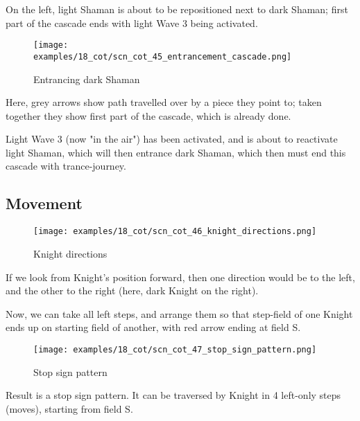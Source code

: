 On the left, light Shaman is about to be repositioned next to dark Shaman; first
part of the cascade ends with light Wave 3 being activated.

\vspace*{5.3\baselineskip}

\noindent
\begin{wrapfigure}[11]{l}{0.4\textwidth}
\centering
\texttt{[image: examples/18\_cot/scn\_cot\_45\_entrancement\_cascade.png]}
\vspace*{-0.4\baselineskip}
\caption{Entrancing dark Shaman}
\label{fig:scn_cot_45_entrancement_cascade}
\end{wrapfigure}
Here, grey arrows show path travelled over by a piece they point to; taken together
they show first part of the cascade, which is already done.

Light Wave 3 (now "in the air") has been activated, and is about to reactivate
light Shaman, which will then entrance dark Shaman, which then must end this
cascade with trance-journey.

\clearpage %

\subsection*{Movement}
\label{sec:Conquest of Tlalocan/Trance-journey/Movement}

\noindent
\begin{wrapfigure}[10]{l}{0.4\textwidth}
\centering
\texttt{[image: examples/18\_cot/scn\_cot\_46\_knight\_directions.png]}
\vspace*{-0.4\baselineskip}
\caption{Knight directions}
\label{fig:scn_cot_46_knight_directions}
\end{wrapfigure}
If we look from Knight's position forward, then one direction would be to
the left, and the other to the right (here, dark Knight on the right).

Now, we can take all left steps, and arrange them so that step-field of one
Knight ends up on starting field of another, with red arrow ending at field S.


\vspace*{3.7\baselineskip}
\noindent
\begin{wrapfigure}[12]{l}{0.4\textwidth}
\centering
\texttt{[image: examples/18\_cot/scn\_cot\_47\_stop\_sign\_pattern.png]}
\vspace*{-0.4\baselineskip}
\caption{Stop sign pattern}
\label{fig:scn_cot_47_stop_sign_pattern}
\end{wrapfigure}
Result is a stop sign pattern. It can be traversed by Knight in 4 left-only
steps (moves), starting from field S.

